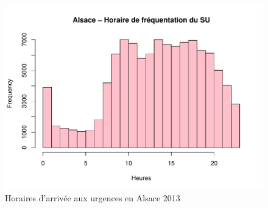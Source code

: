 \documentclass[12pt,english,french]{report}\usepackage{graphicx, color}
\makeatletter
\def\maxwidth{ %
  \ifdim\Gin@nat@width>\linewidth
    \linewidth
  \else
    \Gin@nat@width
  \fi
}
\newenvironment{knitrout}{}{} %
\makeatother
\begin{document}


\begin{figure}
\begin{center}
\begin{knitrout}
\color{fgcolor}
\includegraphics[width=\maxwidth]{figure/test23} 

\end{knitrout}

\end{center}
\caption{Horaires d'arrivée aux urgences en Alsace 2013}
\label{passage:als}
\end{figure}
\end{document}
